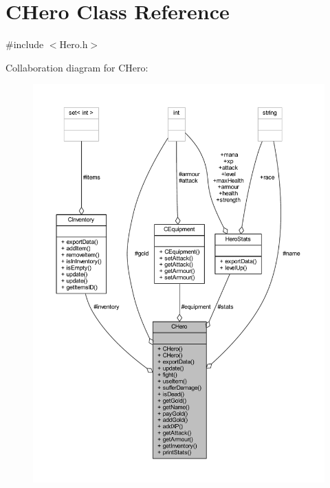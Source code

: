 \hypertarget{class_c_hero}{}\section{C\+Hero Class Reference}
\label{class_c_hero}


{\ttfamily \#include $<$Hero.\+h$>$}



Collaboration diagram for C\+Hero\+:\nopagebreak
\begin{figure}[H]
\begin{center}
\leavevmode
\includegraphics[width=350pt]{class_c_hero__coll__graph}
\end{center}
\end{figure}
